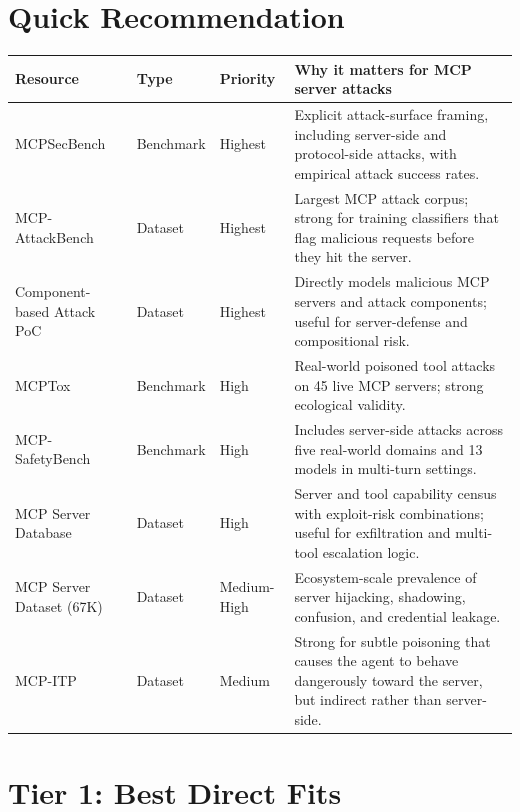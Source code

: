 \documentclass[11pt]{article}
\begin{document}
\section*{Quick Recommendation}
\begin{longtable}{p{} p{} p{} p{}}
\toprule
\textbf{Resource} & \textbf{Type} & \textbf{Priority} & \textbf{Why it matters for MCP server attacks} \\
\midrule
MCPSecBench & Benchmark & Highest & Explicit attack-surface framing, including server-side and protocol-side attacks, with empirical attack success rates. \\
MCP-AttackBench & Dataset & Highest & Largest MCP attack corpus; strong for training classifiers that flag malicious requests before they hit the server. \\
Component-based Attack PoC & Dataset & Highest & Directly models malicious MCP servers and attack components; useful for server-defense and compositional risk. \\
MCPTox & Benchmark & High & Real-world poisoned tool attacks on 45 live MCP servers; strong ecological validity. \\
MCP-SafetyBench & Benchmark & High & Includes server-side attacks across five real-world domains and 13 models in multi-turn settings. \\
MCP Server Database & Dataset & High & Server and tool capability census with exploit-risk combinations; useful for exfiltration and multi-tool escalation logic. \\
MCP Server Dataset (67K) & Dataset & Medium-High & Ecosystem-scale prevalence of server hijacking, shadowing, confusion, and credential leakage. \\
MCP-ITP & Dataset & Medium & Strong for subtle poisoning that causes the agent to behave dangerously toward the server, but indirect rather than server-side. \\
\bottomrule
\end{longtable}

\section*{Tier 1: Best Direct Fits}
\end{document}
